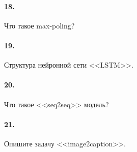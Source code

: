 \documentclass[12pt, twoside]{article}
\begin{document}
\paragraph{18.} Что такое max-poling?

\paragraph{19.} Структура нейронной сети <<LSTM>>.

\paragraph{20.} Что такое <<seq2seq>> модель?

\paragraph{21.} Опишите задачу <<image2caption>>.
\end{document}
